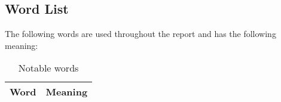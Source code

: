 \subsection{Word List}
The following words are used throughout the report and has the following
meaning:

\begin{table}[H]
\centering

\begin{tabular}{|l|p{6cm}|}
\hline
\textbf{Word} & \textbf{Meaning} \\ \hline

\end{tabular}
\caption{Notable words}
\end{table}





